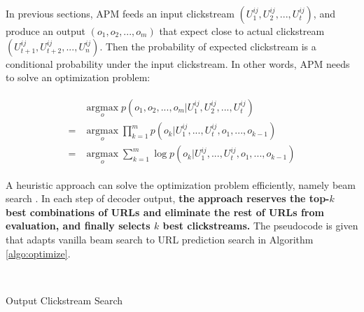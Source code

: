 In previous sections, APM feeds an input clickstream $(U^{ij}_1, U^{ij}_2, ..., U^{ij}_t)$,
and produce an output $(o_1, o_2, ..., o_{m})$ that expect close to actual clickstream 
$(U^{ij}_{t+1}, U^{ij}_{t+2}, ..., U^{ij}_n)$.
Then the probability of expected clickstream is a conditional probability under 
the input clickstream. In other words, APM needs to solve an optimization problem:

\begin{align}
\label{eqn:optimize}
\begin{split}
    & \operatorname*{argmax}_{o} p( o_1, o_2, ..., o_{m} | U^{ij}_1, U^{ij}_2, ..., U^{ij}_t ) \\
   =& \operatorname*{argmax}_{o} \prod_{k=1}^{m} p(o_{k} | U^{ij}_1, ..., U^{ij}_t, o_1, ..., o_{k-1}) \\
   =& \operatorname*{argmax}_{o} \sum_{k=1}^{m} \log p(o_{k} | U^{ij}_1, ..., U^{ij}_t, o_1, ..., o_{k-1})
\end{split}
\end{align}

A heuristic approach can solve the optimization problem efficiently, namely beam search 
\cite{DBLP:journals/corr/abs-1211-3711}.
In each step of decoder output, \textbf{the approach reserves the top-$k$ best combinations of URLs and 
eliminate the rest of URLs from evaluation, and finally selects $k$ best clickstreams.}
The pseudocode is given that adapts vanilla beam search to URL prediction search 
in Algorithm \ref{algo:optimize}.

~\\

\begin{algorithm}[H]
\label{algo:optimize}
\SetAlgoLined
{}
\caption{Output Clickstream Search}
\end{algorithm}

